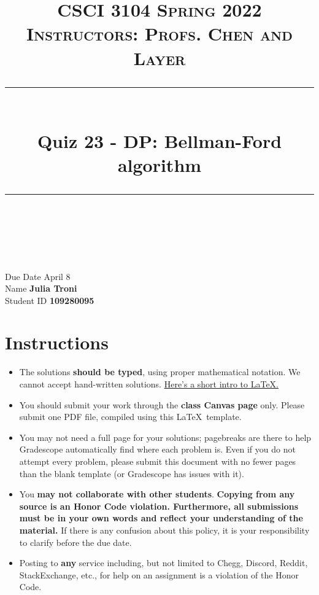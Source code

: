\documentclass[11pt]{article}
\title{
\normalfont \normalsize 
\textsc{CSCI 3104 Spring 2022 \\ 
Instructors: Profs. Chen and Layer} \\
[10pt] 
\rule{\linewidth}{0.5pt} \\[6pt] 
\huge Quiz 23 - DP: Bellman-Ford algorithm \\
\rule{\linewidth}{2pt}  \\[10pt]
}
\date{}
\theoremstyle{definition}
\theoremstyle{definition}
\theoremstyle{definition}
\begin{document}

\maketitle


\noindent
Due Date \dotfill April 8 \\
Name \dotfill \textbf{Julia Troni} \\
Student ID \dotfill \textbf{109280095} \\

\tableofcontents

\section{Instructions}
 \begin{itemize}
	\item The solutions \textbf{should be typed}, using proper mathematical notation. We cannot accept hand-written solutions. \href{http://ece.uprm.edu/~caceros/latex/introduction.pdf}{Here's a short intro to \LaTeX.}
	\item You should submit your work through the \textbf{class Canvas page} only. Please submit one PDF file, compiled using this \LaTeX \ template.
	\item You may not need a full page for your solutions; pagebreaks are there to help Gradescope automatically find where each problem is. Even if you do not attempt every problem, please submit this document with no fewer pages than the blank template (or Gradescope has issues with it).

	\item You \textbf{may not collaborate with other students}. \textbf{Copying from any source is an Honor Code violation. Furthermore, all submissions must be in your own words and reflect your understanding of the material.} If there is any confusion about this policy, it is your responsibility to clarify before the due date. 

	\item Posting to \textbf{any} service including, but not limited to Chegg, Discord, Reddit, StackExchange, etc., for help on an assignment is a violation of the Honor Code.

\end{itemize}
\end{document}
